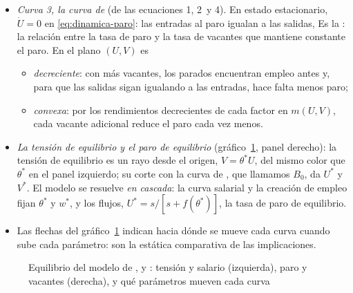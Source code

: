 \documentclass[11pt]{article}
\begin{document}
\begin{itemize}
  \begin{equation}
  (1-\gamma)\,(y-z)=c\left[\frac{r+s}{q(\theta^*)}+\gamma\,\theta^*\right]\label{eq:theta-equilibrio}
  \end{equation}
  El lado derecho crece con $\theta$ y el izquierdo no depende de ella: si $y>z$, hay una única tensión de equilibrio $\theta^*>0$\nocite{Pissarides2000Equilibrium}.
\item \emph{Curva 3, la curva de } (de las ecuaciones 1, 2~y 4). En estado estacionario, $\dot U=0$ en \eqref{eq:dinamica-paro}: las entradas al paro igualan a las salidas,
  Es la : la relación entre la tasa de paro y la tasa de vacantes que mantiene constante el paro. En el plano $(U,V)$ es
  \begin{itemize}
  \item \emph{decreciente}: con más vacantes, los parados encuentran empleo antes y, para que las salidas sigan igualando a las entradas, hace falta menos paro;
  \item \emph{convexa}: por los rendimientos decrecientes de cada factor en $m(U,V)$, cada vacante adicional reduce el paro cada vez menos.
  \end{itemize}
\item \emph{La tensión de equilibrio y el paro de equilibrio} (gráfico~\ref{fig:dmp-equilibrio}, panel derecho): la tensión de equilibrio es un rayo desde el origen, $V=\theta^*U$, del mismo color que $\theta^*$ en el panel izquierdo; su corte con la curva de , que llamamos $B_0$, da $U^*$ y $V^*$. El modelo se resuelve \emph{en cascada}: la curva salarial y la creación de empleo fijan $\theta^*$ y $w^*$, y los flujos, $U^*=s/[s+f(\theta^*)]$, la tasa de paro de equilibrio.
\item Las flechas del gráfico~\ref{fig:dmp-equilibrio} indican hacia dónde se mueve cada curva cuando sube cada parámetro: son la estática comparativa de las implicaciones.
\end{itemize}

\begin{figure}[H]
\centering
\caption{Equilibrio del modelo de ,  y : tensión y salario (izquierda), paro y vacantes (derecha), y qué parámetros mueven cada curva}\label{fig:dmp-equilibrio}
\end{figure}
\end{document}
